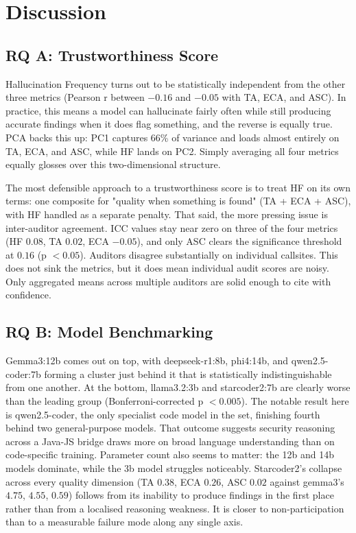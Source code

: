 \section{Discussion}

\subsection{RQ A: Trustworthiness Score}
Hallucination Frequency turns out to be statistically independent from the other three metrics (Pearson r between $-0.16$ and $-0.05$ with TA, ECA, and ASC). In practice, this means a model can hallucinate fairly often while still producing accurate findings when it does flag something, and the reverse is equally true. PCA backs this up: PC1 captures 66\% of variance and loads almost entirely on TA, ECA, and ASC, while HF lands on PC2. Simply averaging all four metrics equally glosses over this two-dimensional structure.

The most defensible approach to a trustworthiness score is to treat HF on its own terms: one composite for "quality when something is found" (TA + ECA + ASC), with HF handled as a separate penalty. That said, the more pressing issue is inter-auditor agreement. ICC values stay near zero on three of the four metrics (HF $0.08$, TA $0.02$, ECA $-0.05$), and only ASC clears the significance threshold at $0.16$ (p $<0.05$). Auditors disagree substantially on individual callsites. This does not sink the metrics, but it does mean individual audit scores are noisy. Only aggregated means across multiple auditors are solid enough to cite with confidence.

\subsection{RQ B: Model Benchmarking}
Gemma3:12b comes out on top, with deepseek-r1:8b, phi4:14b, and qwen2.5-coder:7b forming a cluster just behind it that is statistically indistinguishable from one another. At the bottom, llama3.2:3b and starcoder2:7b are clearly worse than the leading group (Bonferroni-corrected p $<0.005$). The notable result here is qwen2.5-coder, the only specialist code model in the set, finishing fourth behind two general-purpose models. That outcome suggests security reasoning across a Java-JS bridge draws more on broad language understanding than on code-specific training. Parameter count also seems to matter: the 12b and 14b models dominate, while the 3b model struggles noticeably. Starcoder2's collapse across every quality dimension (TA $0.38$, ECA $0.26$, ASC $0.02$ against gemma3's $4.75$, $4.55$, $0.59$) follows from its inability to produce findings in the first place rather than from a localised reasoning weakness. It is closer to non-participation than to a measurable failure mode along any single axis.

